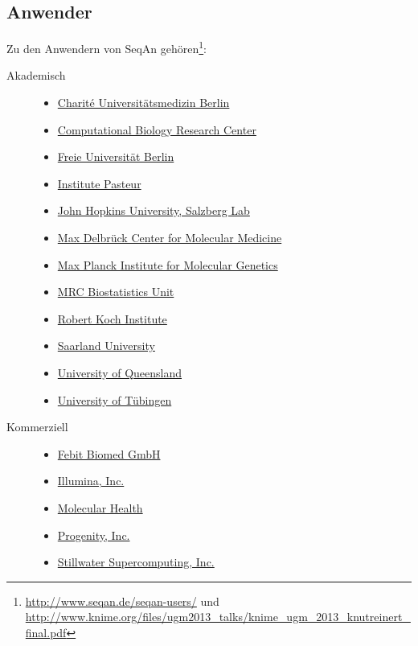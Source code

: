 \subsection{Anwender}
\label{sec:seqan-kunden}

Zu den Anwendern von SeqAn gehören\footnote{\url{http://www.seqan.de/seqan-users/} und \url{http://www.knime.org/files/ugm2013_talks/knime_ugm_2013_knutreinert_final.pdf}}:

\begin{description}
\item[Akademisch] \hfill
\begin{itemize}
\itemsep1pt\parskip0pt
\item
  \href{http://www.charite.de/en/charite/}{Charité Universitätsmedizin
  Berlin}
\item
  \href{http://www.cbrc.jp}{Computational Biology Research Center}
\item
  \href{http://www.fu-berlin.de/}{Freie Universität Berlin}
\item
  \href{http://www.pasteur.fr/fr}{Institute Pasteur}
\item
  \href{http://ccb.jhu.edu/people/salzberg/Salzberg/Salzberg_Lab_Home.html}{John
  Hopkins University, Salzberg Lab}
\item
  \href{http://www.mdc-berlin.de/en/}{Max Delbrück Center for Molecular
  Medicine}
\item
  \href{http://www.molgen.mpg.de/}{Max Planck Institute for Molecular
  Genetics}
\item
  \href{http://www.mrc-bsu.cam.ac.uk}{MRC Biostatistics Unit}
\item
  \href{http://uq.edu.au/}{Robert Koch Institute}
\item
  \href{http://www.uni-saarland.de}{Saarland University}
\item
  \href{http://uq.edu.au/}{University of Queensland}
\item
  \href{https://www.uni-tuebingen.de/en}{University of Tübingen}
\end{itemize}

\item[Kommerziell] \hfill
\begin{itemize}
\itemsep1pt\parskip0pt
\item
  \href{http://www.febit.com/}{Febit Biomed GmbH}
\item
  \href{http://www.illumina.com/}{Illumina, Inc.}
\item
  \href{http://molecularhealth.de}{Molecular Health}
\item
  \href{http://progenity.com}{Progenity, Inc.}
\item
  \href{http://www.stillwater-sc.com}{Stillwater Supercomputing, Inc.}
\end{itemize}


\end{description}
